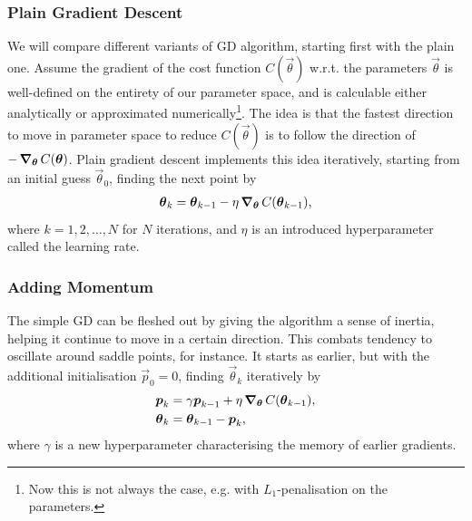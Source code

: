     \subsubsection{Plain Gradient Descent}
        We will compare different variants of GD algorithm, starting first with the plain one. Assume the gradient of the cost function $C(\vec{\theta})$ w.r.t. the parameters $\vec{\theta}$ is well-defined on the entirety of our parameter space, and is calculable either analytically or approximated numerically\footnote{Now this is not always the case, e.g. with $L_1$-penalisation on the parameters.}. The idea is that the fastest direction to move in parameter space to reduce $C(\vec{\theta})$ is to follow the direction of $-\operatorname{\operatorname{\boldsymbol{\nabla}}_{\boldsymbol{\theta}}} C(\boldsymbol{\theta})$. Plain gradient descent implements this idea iteratively, starting from an initial guess $\vec{\theta}_0$, finding the next point by
        \begin{align*}
            \boldsymbol{\theta}_{k} = \boldsymbol{\theta}_{k-1} - \eta \operatorname{\operatorname{\boldsymbol{\nabla}}_{\boldsymbol{\theta}}} C(\boldsymbol{\theta}_{k-1}),
        \end{align*}
        where $k=1,2,\ldots,N$ for $N$ iterations, and $\eta$ is an introduced hyperparameter called the learning rate.

    \subsubsection{Adding Momentum}
        The simple GD can be fleshed out by giving the algorithm a sense of inertia, helping it continue to move in a certain direction. This combats tendency to oscillate around saddle points, for instance. It starts as earlier, but with the additional initialisation $\vec{p}_0 = 0$, finding $\vec{\theta}_k$ iteratively by 
        \begin{subequations}
            \begin{align}
                \boldsymbol{p}_{k} &= \gamma \boldsymbol{p}_{k-1} + \eta \operatorname{\operatorname{\boldsymbol{\nabla}}_{\boldsymbol{\theta}}} C(\boldsymbol{\theta}_{k-1}), \\
                \boldsymbol{\theta}_k &= \boldsymbol{\theta}_{k-1} - \boldsymbol{p}_k,
            \end{align}
        \end{subequations}
        where $\gamma$ is a new hyperparameter characterising the memory of earlier gradients.

